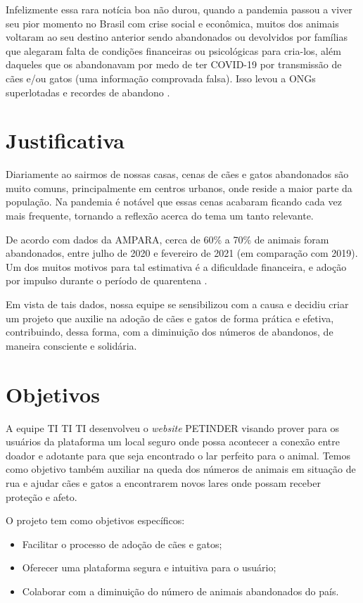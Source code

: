 Infelizmente essa rara notícia boa não durou, quando a pandemia passou a viver seu pior momento no Brasil com crise social e econômica, muitos dos animais voltaram ao seu destino anterior sendo abandonados ou devolvidos por famílias que alegaram falta de condições financeiras ou psicológicas para cria-los, além daqueles que os abandonavam por medo de ter \gls{COVID-19} por transmissão de cães e/ou gatos (uma informação comprovada falsa). Isso levou a \ac{ONGs} superlotadas e recordes de abandono \cite{abandono_animais}.



\section{Justificativa}
Diariamente ao sairmos de nossas casas, cenas de cães e gatos abandonados são muito comuns, principalmente em centros urbanos, onde reside a maior parte da população. Na pandemia é notável que essas cenas acabaram ficando cada vez mais frequente, tornando a reflexão acerca do tema um tanto relevante.

De acordo com dados da \gls{AMPARA}, cerca de 60\% a 70\% de animais foram abandonados, entre julho de 2020 e fevereiro de 2021 (em comparação com 2019). Um dos muitos motivos para tal estimativa é a dificuldade financeira, e adoção por impulso durante o período de quarentena \cite{abandono}.

Em vista de tais dados, nossa equipe se sensibilizou com a causa e decidiu criar um projeto que auxilie na adoção de cães e gatos de forma prática e efetiva, contribuindo, dessa forma, com a diminuição dos números de abandonos, de maneira consciente e solidária.

\section{Objetivos}

A equipe TI TI TI desenvolveu o \textit{website} PETINDER visando prover para os usuários da plataforma um local seguro onde possa acontecer a conexão entre doador e adotante para que seja encontrado o lar perfeito para o animal. Temos como objetivo também auxiliar na queda dos números de animais em situação de rua e ajudar cães e gatos a encontrarem novos lares onde possam receber proteção e afeto.

O projeto tem como objetivos específicos:

\begin{itemize}
\item Facilitar o processo de adoção de cães e gatos;
\item Oferecer uma plataforma segura e intuitiva para o usuário;
\item Colaborar com a diminuição do número de animais abandonados do país.
\end{itemize}

